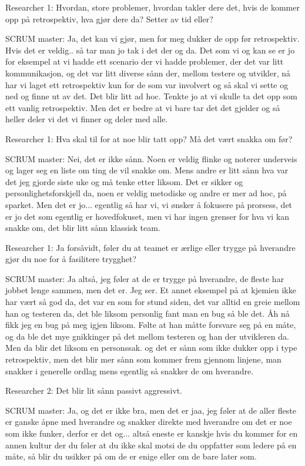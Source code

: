 \documentclass[12pt, a4paper]{report}
\begin{document}
Researcher 1: Hvordan, store problemer, hvordan takler dere det, hvis de kommer opp på retrospektiv, hva gjør dere da? Setter av tid eller?

SCRUM master: Ja, det kan vi gjør, men for meg dukker de opp før retrospektiv. Hvis det er veldig.. så tar man jo tak i det der og da. Det som vi og kan se er jo for eksempel at vi hadde ett scenario der vi hadde problemer, der det var litt kommunikasjon, og det var litt diverse sånn der, mellom testere og utvikler, nå har vi laget ett retrospektiv kun for de som var involvert og så skal vi sette og ned og finne ut av det. Det blir litt ad hoc. Tenkte jo at vi skulle ta det opp som ett vanlig retrospektiv. Men det er bedre at vi bare tar det det gjelder og så heller deler vi det vi finner og deler med alle.

Researcher 1: Hva skal til for at noe blir tatt opp? Må det vært snakka om før?

SCRUM master: Nei, det er ikke sånn. Noen er veldig flinke og noterer underveis og lager seg en liste om ting de vil snakke om. Mens andre er litt sånn hva var det jeg gjorde siste uke og må tenke etter liksom. Det er sikker og personlighetsforskjell da, noen er veldig metodiske og andre er mer ad hoc, på sparket. Men det er jo... egentlig så har vi, vi ønsker å fokusere på prorsess, det er jo det som egentlig er hovedfokuset, men vi har ingen grenser for hva vi kan snakke om, det blir  litt sånn klassisk team.

Researcher 1: Ja forsåvidt, føler du at teamet er ærlige eller trygge på hverandre gjør du noe for å fasilitere trygghet? 

SCRUM master: Ja altså, jeg føler at de er trygge på hverandre, de fleste har jobbet lenge sammen, men det er. Jeg ser. Et annet eksempel på at kjemien ikke har vært så god da, det var en som for stund siden, det var alltid en greie mellom han og testeren da, det ble liksom personlig fant man en bug så ble det. Åh nå fikk jeg en bug på meg igjen liksom. Følte at han måtte forsvare seg på en måte, og da ble det mye gnikkinger på det mellom testeren og han der utvikleren da. Men da blir det liksom en personssak. og det er sånn som ikke dukker opp i type retrospektiv, men det blir mer sånn som kommer frem gjennom linjene, man snakker i generelle ordlag mens egentlig så snakker de om hverandre.

Researcher 2: Det blir lit sånn passivt aggressivt. 

SCRUM master: Ja, og det er ikke bra, men det er jaa, jeg føler at de aller fleste er ganske åpne med hverandre og snakker direkte med hverandre om det er noe som ikke funker, derfor er det og... altså eneste er kanskje hvis du kommer for en annen kultur der du føler at du ikke skal motsi de du oppfatter som ledere på en måte, så blir du usikker på om de er enige eller om de bare later som.
\end{document}

